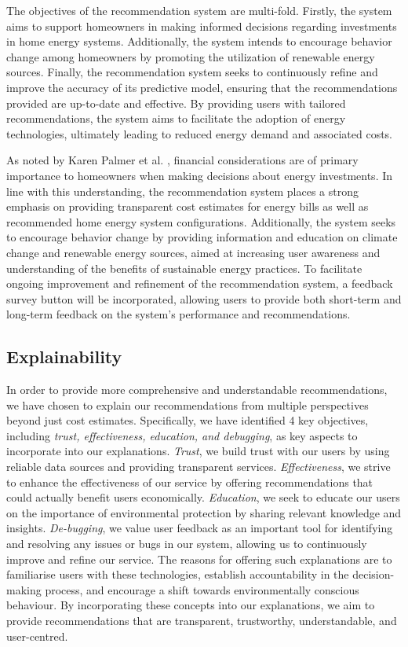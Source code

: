 The objectives of the recommendation system are multi-fold. 
Firstly, the system aims to support homeowners in making informed decisions regarding investments in home energy systems. 
Additionally, the system intends to encourage behavior change among homeowners by promoting the utilization of renewable energy sources. 
Finally, the recommendation system seeks to continuously refine and improve the accuracy of its predictive model, ensuring that the recommendations provided are up-to-date and effective. 
By providing users with tailored recommendations, the system aims to facilitate the adoption of energy technologies, ultimately leading to reduced energy demand and associated costs. 

As noted by Karen Palmer et al. \cite{informationgap}, financial considerations are of primary importance to homeowners when making decisions about energy investments. 
In line with this understanding, the recommendation system places a strong emphasis on providing transparent cost estimates for energy bills as well as recommended home energy system configurations. 
Additionally, the system seeks to encourage behavior change by providing information and education on climate change and renewable energy sources, aimed at increasing user awareness and understanding of the benefits of sustainable energy practices. 
To facilitate ongoing improvement and refinement of the recommendation system, a feedback survey button will be incorporated, allowing users to provide both short-term and long-term feedback on the system's performance and recommendations. 

\subsection{Explainability}

In order to provide more comprehensive and understandable recommendations, we have chosen to explain our recommendations from multiple perspectives beyond just cost estimates. 
Specifically, we have identified 4 key objectives, including \emph{trust, effectiveness, education, and debugging}, as key aspects to incorporate into our explanations. 
\emph{Trust}, we build trust with our users by using reliable data sources and providing transparent services. 
\emph{Effectiveness}, we strive to enhance the effectiveness of our service by offering recommendations that could actually benefit users economically. 
\emph{Education}, we seek to educate our users on the importance of environmental protection by sharing relevant knowledge and insights. 
\emph{De-bugging}, we value user feedback as an important tool for identifying and resolving any issues or bugs in our system, allowing us to continuously improve and refine our service.
The reasons for offering such explanations are to familiarise users with these technologies, establish accountability in the decision-making process, and encourage a shift towards environmentally conscious behaviour.
By incorporating these concepts into our explanations, we aim to provide recommendations that are transparent, trustworthy, understandable, and user-centred. 

